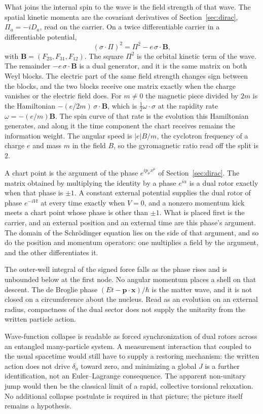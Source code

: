 \documentclass[a4paper]{article}
\begin{document}
What joins the internal spin to the wave is the field strength of that wave. The spatial kinetic momenta are the covariant derivatives of Section~\ref{sec:dirac}, $\Pi_a=-iD_a$, read on the carrier. On a twice differentiable carrier in a differentiable potential,
\[
(\sigma\cdot\Pi)^2=\Pi^2-e\,\sigma\cdot\mathbf B,
\]
with $\mathbf B=(F_{23},F_{31},F_{12})$. The square $\Pi^2$ is the orbital kinetic term of the wave. The remainder $-e\,\sigma\cdot\mathbf B$ is a dual generator, and it is the same matrix on both Weyl blocks. The electric part of the same field strength changes sign between the blocks, and the two blocks receive one matrix exactly when the charge vanishes or the electric field does. For $m\neq 0$ the magnetic piece divided by $2m$ is the Hamiltonian $-(e/2m)\,\sigma\cdot\mathbf B$, which is $\tfrac12\omega\cdot\sigma$ at the rapidity rate $\omega=-(e/m)\mathbf B$. The spin curve of that rate is the evolution this Hamiltonian generates, and along it the time component the chart receives remains the information weight. The angular speed is $|e|B/m$, the cyclotron frequency of a charge $e$ and mass $m$ in the field $B$, so the gyromagnetic ratio read off the split is $2$.

A chart point is the argument of the phase $e^{ip_\mu x^\mu}$ of Section~\ref{sec:dirac}. The matrix obtained by multiplying the identity by a phase $e^{i\alpha}$ is a dual rotor exactly when that phase is $\pm 1$. A constant external potential supplies the dual rotor of phase $e^{-iVt}$ at every time exactly when $V=0$, and a nonzero momentum kick meets a chart point whose phase is other than $\pm 1$. What is placed first is the carrier, and an external position and an external time are this phase's argument. The domain of the Schr\"odinger equation lies on the side of that argument, and so do the position and momentum operators: one multiplies a field by the argument, and the other differentiates it.

The outer-well integral of the signed force falls as the phase rises and is unbounded below at the first node. No angular momentum places a shell on that descent. The de Broglie phase \((Et-\mathbf{p}\cdot\mathbf{x})/\hbar\) is the matter wave, and it is not closed on a circumference about the nucleus. Read as an evolution on an external radius, compactness of the dual sector does not supply the unitarity from the written particle action.

Wave-function collapse is readable as forced synchronization of dual rotors across an entangled many-particle system. A measurement interaction that coupled to the usual spacetime would still have to supply a restoring mechanism: the written action does not drive $\delta_a$ toward zero, and minimizing a global $J$ is a further identification, not an Euler--Lagrange consequence. The apparent non-unitary jump would then be the classical limit of a rapid, collective torsional relaxation. No additional collapse postulate is required in that picture; the picture itself remains a hypothesis.
\end{document}
